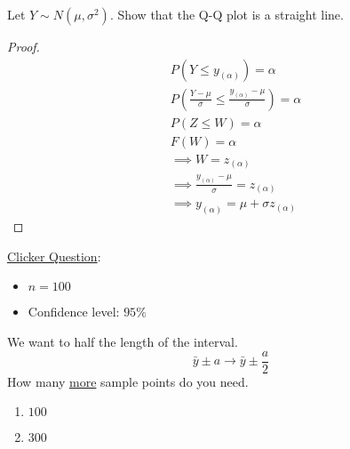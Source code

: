 Let $ Y \sim N(\mu,\sigma^2) $. Show that the Q-Q plot is a straight line.
\begin{proof}
    \begin{align*}
         & P(Y\leqslant y_{(\alpha)})=\alpha                                                      \\
         & P\left( \frac{Y-\mu}{\sigma} \leqslant \frac{y_{(\alpha)}-\mu}{\sigma}  \right)=\alpha \\
         & P(Z\leqslant W)=\alpha                                                                 \\
         & F(W)=\alpha                                                                            \\
         & \implies W=z_{(\alpha)}                                                                \\
         & \implies \frac{y_{(\alpha)}-\mu}{\sigma}=z_{(\alpha)}                                  \\
         & \implies y_{(\alpha)}=\mu+\sigma z_{(\alpha)}
    \end{align*}
\end{proof}

\underline{Clicker Question}:
\begin{itemize}
    \item $ n=100 $
    \item Confidence level: $ 95\% $
\end{itemize}
We want to half the length of the interval.
\[ \bar{y}\pm a\rightarrow \bar{y}\pm \frac{a}{2} \] How many
\underline{more} sample points do you need.
\begin{enumerate}[label=(\alph*)]
    \item $ 100 $
    \item $ 300 $
\end{enumerate}
